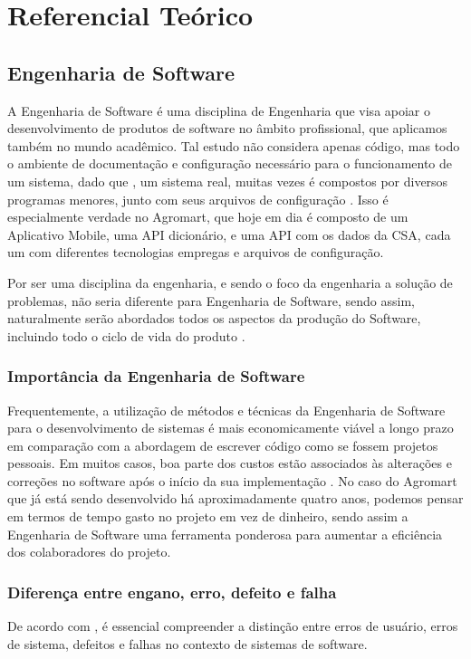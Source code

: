 \chapter[Referencial Teórico]{Referencial Teórico}

\section{Engenharia de Software}

A Engenharia de Software é uma disciplina de Engenharia que visa apoiar o desenvolvimento de produtos de software no âmbito profissional, que aplicamos também no mundo acadêmico. Tal estudo não considera apenas código, mas todo o ambiente de documentação e configuração necessário para o funcionamento de um sistema, dado que , um sistema real, muitas vezes é compostos por diversos programas menores, junto com seus arquivos de configuração \cite{Sommerville2007}. Isso é especialmente verdade no Agromart, que hoje em dia é composto de um Aplicativo Mobile, uma API dicionário, e uma API com os dados da CSA, cada um com diferentes tecnologias empregas e arquivos de configuração.

Por ser uma disciplina da engenharia, e sendo o foco da engenharia a solução de problemas, não seria diferente para Engenharia de Software, sendo assim, naturalmente serão abordados todos os aspectos da produção do Software, incluindo todo o ciclo de vida do produto \cite{Sommerville2007}.

\subsection{Importância da Engenharia de Software}
Frequentemente, a utilização de métodos e técnicas da Engenharia de Software para o desenvolvimento de sistemas é mais economicamente viável a longo prazo em comparação com a abordagem de escrever código  como se fossem projetos pessoais. Em muitos casos, boa parte dos custos estão associados às alterações e correções no software após o início da sua implementação \cite{Sommerville2007}. No caso do Agromart que já está sendo desenvolvido há aproximadamente quatro anos, podemos pensar em termos de tempo gasto no projeto em vez de dinheiro, sendo assim a Engenharia de Software uma ferramenta ponderosa para aumentar a eficiência dos colaboradores do projeto.

\subsection{Diferença entre engano, erro, defeito e falha}
De acordo com \citeauthor[p. 207]{Sommerville2007}, é essencial compreender a distinção entre erros de usuário, erros de sistema, defeitos e falhas no contexto de sistemas de software.

